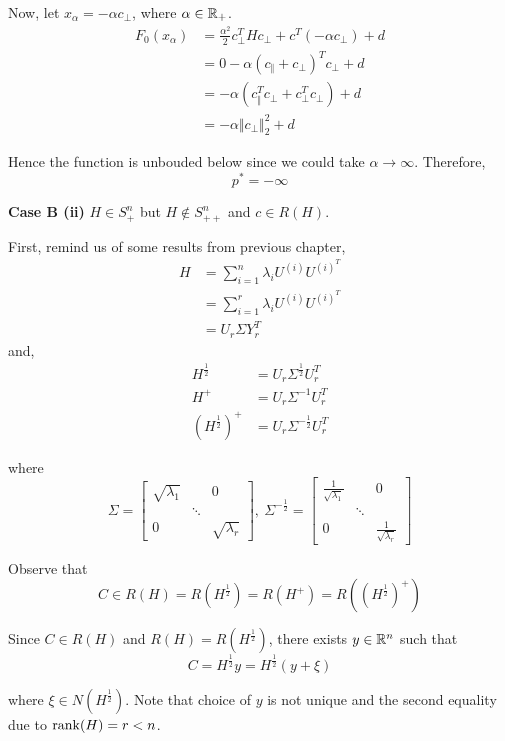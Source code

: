 Now, let $x_{\alpha} =-\alpha c_{\perp}$, where $\alpha \in \mathbb{R}_+$.
\begin{align*}
F_0(x_{\alpha}) 
&=\frac{{\alpha}^2}{2}c_{\perp}^THc_{\perp} + c^T(-\alpha c_{\perp}) + d\\
&= 0 - \alpha(c_{\Vert} + c_{\perp})^Tc_{\perp} + d\\
&= -\alpha(c_{\Vert}^Tc_{\perp} + c_{\perp}^Tc_{\perp}) + d\\
&= -\alpha \Vert c_{\perp}\Vert^2_2 + d
\end{align*}

Hence the function is unbouded below since we could take $\alpha \to\infty$. Therefore,
$$p^*=-\infty$$



\vspace{0.3cm}
\textbf{Case B (ii)}  $H\in S_+^n$ but $H\notin S^n_{++}$ and $c \in R(H)$.

First, remind us of some results from previous chapter,
\begin{align*}
H 
&= \sum^n_{i=1}\lambda_i U^{(i)}U^{(i)^T} \\
&= \sum^r_{i=1}\lambda_i U^{(i)}U^{(i)^T}\\
&= U_r\Sigma Y_r^T
\end{align*}
and,
\begin{align*}
H^{\frac{1}{2}} &= U_r\Sigma^{\frac{1}{2}}U_r^T\\
H^{+} &= U_r\Sigma^{-1}U_r^T\\
(H^{\frac{1}{2}})^+ &= U_r\Sigma^{-\frac{1}{2}}U_r^T
\end{align*}

where 
$$\Sigma = 
\begin{bmatrix}
\sqrt{\lambda_1} &  & 0 \\
&\ddots&\\
0&&\sqrt{\lambda_r}
\end{bmatrix}
,\
\Sigma^{-\frac{1}{2}} =
\begin{bmatrix}
\frac{1}{\sqrt{\lambda_1}} &  & 0 \\
&\ddots&\\
0&&\frac{1}{\sqrt{\lambda_r}}
\end{bmatrix}
$$

Observe that
$$C\in R(H) = R(H^{\frac{1}{2}}) = R(H^+) = R\left((H^{\frac{1}{2}})^+\right)$$

Since $C\in R(H)$ and $R(H) = R(H^{\frac{1}{2}})$, there exists $y \in \mathbb{R}^n$ such that
$$C = H^{\frac{1}{2}}y = H^{\frac{1}{2}}(y+\xi)$$

where $\xi \in N(H^{\frac{1}{2}})$. Note that choice of $y$ is not unique and the second equality due to $\operatorname{rank}(H)= r<n$. 

